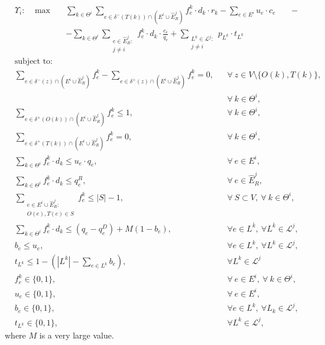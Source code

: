 \documentclass{article}
\begin{document}
    \begin{align}
        &  \Upsilon_i: \hspace{10pt} \max  &&  \sum_{k\in \Theta^i} \sum_{e \in \delta^-(T(k))\cap (E^i\cup \widehat{E}_R^j)} f_e^k \cdot d_k \cdot r_k - \sum_{e\in E^i} u_e\cdot c_e \hspace{20pt} -  \nonumber  \label{eq:IterativeA}\\
        & 								  && - \sum_{k \in \Theta^i} \sum_{\substack{e \in \widehat{E}_R^j\colon \\ j\not = i}} f_e^k \cdot d_k \cdot \frac{c_e}{q_e}   + \sum_{\substack{L^k \in \mathcal{L}^j \colon \\j\not = i}} p_{L^k} \cdot t_{L^k}
    \end{align}
    \begin{align}
        & \text{subject to:}       && \nonumber\\
& \sum_{e \in \delta^-(z)\cap (E^i\cup \widehat{E}_R^j)} f_e^k-\sum_{e \in \delta^+(z)\cap (E^i\cup \widehat{E}_R^j)} f_{e}^k  = 0,                                   && \forall\ z\in V\setminus\{O(k),T(k)\},\nonumber\\[-1em]
& && \forall\ k\in\Theta^i,  \label{eq:IterativeB}\\[1em]
& \sum_{e \in \delta^+(O(k))\cap (E^i\cup \widehat{E}_R^j)} f_e^k  \leq 1, && \forall\ k\in \Theta^i, \label{eq:IterativeC} \\
& \sum_{e \in \delta^+(T(k))\cap (E^i\cup \widehat{E}_R^j)} f_e^k  = 0,  && \forall\ k\in \Theta^i, \label{eq:IterativeD} \\
& \sum_{k \in \Theta^i} f_e^k\cdot d_k \leq u_e\cdot q_e, && \forall\ e \in E^i, \label{eq:IterativeE}  \\
& \sum_{k \in \Theta^i} f_e^k\cdot d_k \leq  q_e^R, && \forall\ e \in \widehat{E}_R^j,\label{eq:IterativeF}  \\
& \sum_{\substack{e \in E^i\cup \widehat{E}_R^j\colon \\ O(e),T(e) \in S}}  f_e^k  \leq |S| -1, && \forall\ S \subset V,\ \forall\ k \in \Theta^i, \label{eq:IterativeG}\\
&\sum_{k\in \Theta^i} f_e^k \cdot d_k \leq (q_e - q_e^D) +M(1-b_e),\quad && \forall e \in L^{\bar{k}},\ \forall L^{\bar{k}} \in \mathcal{L}^j, \label{eq:IterativeH}\\[5pt]
&b_e \leq u_e, && \forall e\in L^k,\ \forall L^k \in \mathcal{L}^j, \label{eq:IterativeI}\\[5pt]
& t_{L^k} \leq 1 -  (|L^k|-\sum_{e \in L^k} b_e), && \forall L^k \in \mathcal{L}^j \label{eq:IterativeJ}\\
& f_e^k  \in \{0,1\}, && \forall\ e \in E^i,\ \forall\ k \in \Theta^i, \label{eq:IterativeK} \\
&  u_e   \in \{0,1\},   && \forall\ e \in E^i,  \label{eq:IterativeL}\\
& b_e \in \{0,1\}, && \forall e \in L^k,\ \forall L_k\in \mathcal{L}^j,\label{eq:IterativeM}\\[5pt]
& t_{L^k} \in \{0,1\}, && \forall L^k \in \mathcal{L}^j, \label{eq:IterativeN}
    \end{align}
where $M$ is a very large value.
\end{document}
